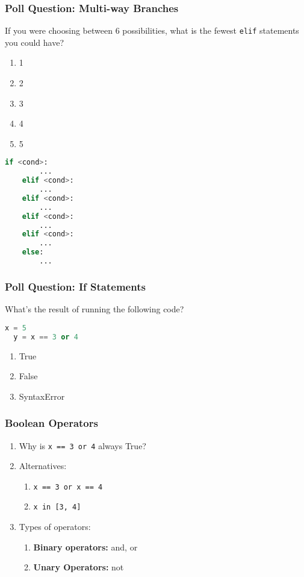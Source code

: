 \documentclass{beamer}
\begin{document}
%
%
\begin{frame}[fragile]
	\frametitle{Poll Question: Multi-way Branches}
	If you were choosing between 6 possibilities, what is the fewest \lstinline|elif| statements you could have?
	\vfill
	\begin{minipage}{0.49\textwidth}
		\begin{enumerate}[A]
			\item 1
			\item 2
			\item 3
			\item 4
			\item 5
		\end{enumerate}
	\end{minipage}
	\pause
	\begin{minipage}{0.49\textwidth}
		\begin{lstlisting}[language=Python, autogobble]
	if <cond>:
		...
	elif <cond>:
		...
	elif <cond>:
		...
	elif <cond>:
		...
	elif <cond>:
		...
	else:
		...
		\end{lstlisting}
	\end{minipage}
\end{frame}

%
%
\begin{frame}[fragile]
	\frametitle{Poll Question: If Statements}
	What's the result of running the following code?
	\begin{lstlisting}[language=Python, autogobble]
	x = 5
  y = x == 3 or 4
	\end{lstlisting}
	\vfill
	\begin{enumerate}[A]
		\item True
		\item False
		\item SyntaxError
	\end{enumerate}
	\pause
	
\end{frame}

%
%
\begin{frame}[fragile]
	\frametitle{Boolean Operators}
	\begin{enumerate}[A]
		\item Why is \lstinline|x == 3 or 4| always True?
		\item Alternatives:
			\begin{enumerate}
				\item \lstinline|x == 3 or x == 4|
				\item \lstinline|x in [3, 4]|
			\end{enumerate}
		\item Types of operators:
			\begin{enumerate}
				\item \textbf{Binary operators:} and, or
				\item \textbf{Unary Operators: } not
			\end{enumerate}
	\end{enumerate}
\end{frame}
\end{document}
